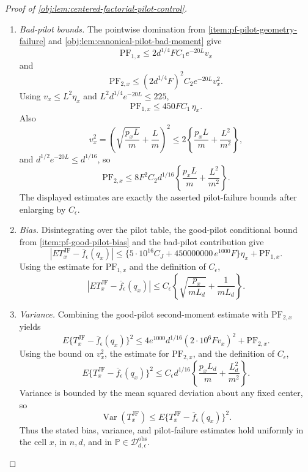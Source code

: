 \begin{proof}[Proof of \cref{obj:lem:centered-factorial-pilot-control}]
\begin{enumerate}
\item \emph{Bad-pilot bounds.}
The pointwise domination from \cref{item:pf-pilot-geometry-failure} and \cref{obj:lem:canonical-pilot-bad-moment} give
\[
\mathrm{PF}_{1,x}
\le
2d^{1/4}FC_1e^{-20L}v_x
\]
and
\[
\mathrm{PF}_{2,x}
\le
(2d^{1/4}F)^2C_2e^{-20L}v_x^2 .
\]
Using \(v_x\le L^2\eta_x\) and \(L^2d^{1/4}e^{-20L}\le225\),
\[
\mathrm{PF}_{1,x}\le450FC_1\,\eta_x .
\]
Also
\[
v_x^2
=
\left(\sqrt{\frac{p_xL}{m}}+\frac Lm\right)^2
\le
2\left\{\frac{p_xL}{m}+\frac{L^2}{m^2}\right\},
\]
and \(d^{1/2}e^{-20L}\le d^{1/16}\), so
\[
\mathrm{PF}_{2,x}
\le
8F^2C_2d^{1/16}
\left\{\frac{p_xL}{m}+\frac{L^2}{m^2}\right\}.
\]
The displayed estimates are exactly the asserted pilot-failure bounds after enlarging by
\(C_\epsilon\).

\item \emph{Bias.}
Disintegrating over the pilot table, the good-pilot conditional bound from \cref{item:pf-good-pilot-bias} and the bad-pilot contribution give
\[
\left|
E T_x^{\mathrm{JF}}-\bar f_\epsilon(q_x)
\right|
\le
\{5\cdot10^{16}C_J+450000000\,e^{1000}F\}\eta_x+\mathrm{PF}_{1,x}.
\]
Using the estimate for \(\mathrm{PF}_{1,x}\) and the definition of \(C_\epsilon\),
\[
\left|
E T_x^{\mathrm{JF}}-\bar f_\epsilon(q_x)
\right|
\le
C_\epsilon
\left\{
\sqrt{\frac{p_x}{mL_d}}+\frac1{mL_d}
\right\}.
\]

\item \emph{Variance.}
Combining the good-pilot second-moment estimate with \(\mathrm{PF}_{2,x}\) yields
\[
E\{T_x^{\mathrm{JF}}-\bar f_\epsilon(q_x)\}^2
\le
4e^{1000}d^{1/16}(2\cdot10^6Fv_x)^2+\mathrm{PF}_{2,x}.
\]
Using the bound on \(v_x^2\), the estimate for \(\mathrm{PF}_{2,x}\), and the definition of
\(C_\epsilon\),
\[
E\{T_x^{\mathrm{JF}}-\bar f_\epsilon(q_x)\}^2
\le
C_\epsilon d^{1/16}
\left\{
\frac{p_xL_d}{m}+\frac{L_d^2}{m^2}
\right\}.
\]
Variance is bounded by the mean squared deviation about any fixed center, so
\[
\operatorname{Var}(T_x^{\mathrm{JF}})
\le
E\{T_x^{\mathrm{JF}}-\bar f_\epsilon(q_x)\}^2.
\]
Thus the stated bias, variance, and pilot-failure estimates hold uniformly in the cell \(x\), in
\(n,d\), and in \(\mathbb P\in\mathcal D_{d,\epsilon}^{\mathrm{obs}}\).
\end{enumerate}
\end{proof}
